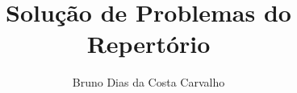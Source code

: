 \documentclass[11pt,a4paper,titlepage]{article}
\title{Solução de Problemas do Repertório}
\author{Bruno Dias da Costa Carvalho}
\begin{document}
\maketitle


\pagebreak

\pagebreak

\pagebreak

\pagebreak

\pagebreak

\pagebreak

\pagebreak

\pagebreak

\pagebreak

\end{document}
